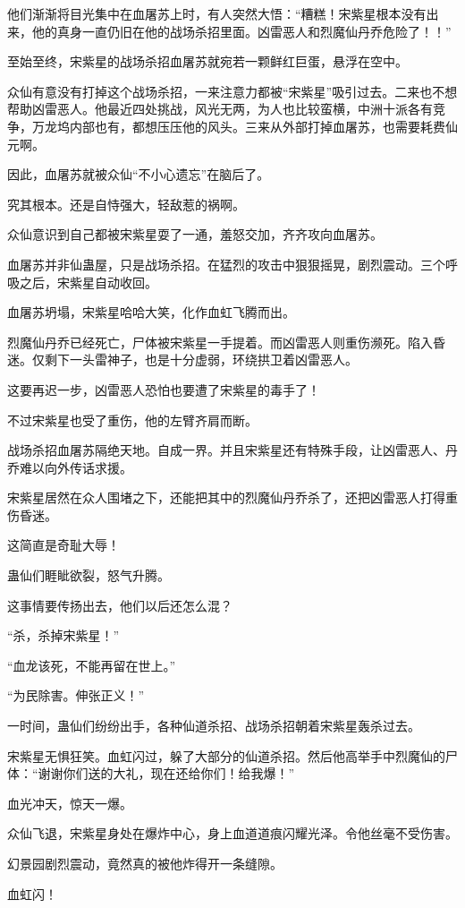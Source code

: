 \begin{this_body}
他们渐渐将目光集中在血屠苏上时，有人突然大悟：“糟糕！宋紫星根本没有出来，他的真身一直仍旧在他的战场杀招里面。凶雷恶人和烈魔仙丹乔危险了！！”

至始至终，宋紫星的战场杀招血屠苏就宛若一颗鲜红巨蛋，悬浮在空中。

众仙有意没有打掉这个战场杀招，一来注意力都被“宋紫星”吸引过去。二来也不想帮助凶雷恶人。他最近四处挑战，风光无两，为人也比较蛮横，中洲十派各有竞争，万龙坞内部也有，都想压压他的风头。三来从外部打掉血屠苏，也需要耗费仙元啊。

因此，血屠苏就被众仙“不小心遗忘”在脑后了。

究其根本。还是自恃强大，轻敌惹的祸啊。

众仙意识到自己都被宋紫星耍了一通，羞怒交加，齐齐攻向血屠苏。

血屠苏并非仙蛊屋，只是战场杀招。在猛烈的攻击中狠狠摇晃，剧烈震动。三个呼吸之后，宋紫星自动收回。

血屠苏坍塌，宋紫星哈哈大笑，化作血虹飞腾而出。

烈魔仙丹乔已经死亡，尸体被宋紫星一手提着。而凶雷恶人则重伤濒死。陷入昏迷。仅剩下一头雷神子，也是十分虚弱，环绕拱卫着凶雷恶人。

这要再迟一步，凶雷恶人恐怕也要遭了宋紫星的毒手了！

不过宋紫星也受了重伤，他的左臂齐肩而断。

战场杀招血屠苏隔绝天地。自成一界。并且宋紫星还有特殊手段，让凶雷恶人、丹乔难以向外传话求援。

宋紫星居然在众人围堵之下，还能把其中的烈魔仙丹乔杀了，还把凶雷恶人打得重伤昏迷。

这简直是奇耻大辱！

蛊仙们睚眦欲裂，怒气升腾。

这事情要传扬出去，他们以后还怎么混？

“杀，杀掉宋紫星！”

“血龙该死，不能再留在世上。”

“为民除害。伸张正义！”

一时间，蛊仙们纷纷出手，各种仙道杀招、战场杀招朝着宋紫星轰杀过去。

宋紫星无惧狂笑。血虹闪过，躲了大部分的仙道杀招。然后他高举手中烈魔仙的尸体：“谢谢你们送的大礼，现在还给你们！给我爆！”

血光冲天，惊天一爆。

众仙飞退，宋紫星身处在爆炸中心，身上血道道痕闪耀光泽。令他丝毫不受伤害。

幻景园剧烈震动，竟然真的被他炸得开一条缝隙。

血虹闪！


\end{this_body}
